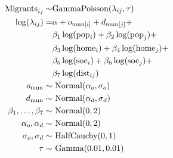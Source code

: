 \documentclass[fleqn,10pt]{SelfArx} %
\begin{document}
        \begin{subequations}
          \begin{align} \text{Migrants}_{ij} \sim & \text{GammaPoisson}(\lambda_{ij}, \tau) \label{outcome}\\
            \log(\lambda_{ij}) =
            & \alpha + o_{\text{mun}[i]} + d_{\text{mun}[j]} + \notag
            \\ & \beta_1 \log(\text{pop}_i) +
            \beta_2\log(\text{pop}_j) + \notag \\ & \beta_3
            \log(\text{home}_i) + \beta_4 \log(\text{home}_j) + \notag\\
            & \beta_5 \log(\text{soc}_i) + \beta_6 \log(\text{soc}_j)
            + \notag \\ & \beta_7 \log(\text{dist}_{ij}) \label{linear} \\
            o_{\text{mun}} \sim& \text{ Normal}(\alpha_o, \sigma_o) \label{muno} \\
            d_{\text{mun}} \sim& \text{ Normal}(\alpha_d, \sigma_d) \label{mund} \\
            \beta_1,\ldots, \beta_7 \sim& \text{
                                          Normal}(0,2)\\ \alpha_o, \alpha_d \sim& \text{ Normal}(0,2)\\
            \sigma_o, \sigma_d \sim& \text{ HalfCauchy}(0,1) \\ \tau
            \sim& \text{ Gamma}(0.01, 0.01)
          \end{align}
          \label{model}
        \end{subequations}
\end{document}
